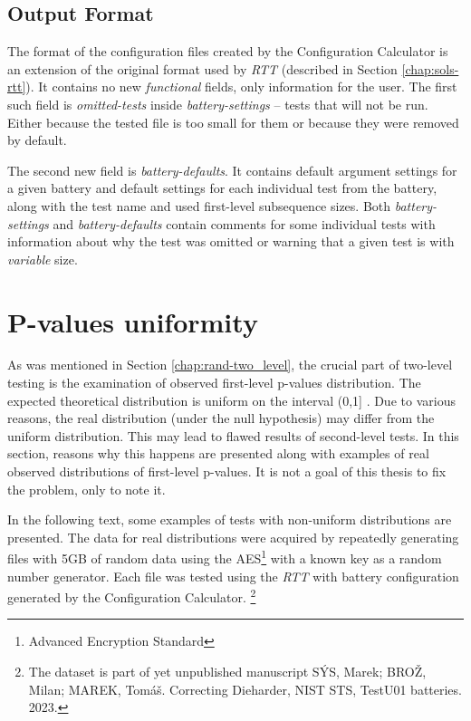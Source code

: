 \documentclass[
  digital,     %
  oneside,     %
  nosansbold,  %
  nocolorbold, %
  nolof,         %
  nolot,         %
]{fithesis4}
\begin{document}
\subsection{Output Format}
The format of the configuration files created by the Configuration Calculator is an extension of the original format used by \emph{RTT} (described in Section \ref{chap:sols-rtt}). It contains no new \emph{functional} fields, only information for the user. The first such field is \emph{omitted-tests} inside \emph{battery-settings} -- tests that will not be run. Either because the tested file is too small for them or because they were removed by default.

The second new field is \emph{battery-defaults}. It contains default argument settings for a given battery and default settings for each individual test from the battery, along with the test name and used first-level subsequence sizes. Both \emph{battery-settings} and \emph{battery-defaults} contain comments for some individual tests with information about why the test was omitted or warning that a given test is with \emph{variable} size.



\section{P-values uniformity} \label{chap:analysis-uniform}
As was mentioned in Section \ref{chap:rand-two_level}, the crucial part of two-level testing is the examination of observed first-level p-values distribution. The expected theoretical distribution is uniform on the interval (0,1] \cite[p.~14]{bad_day}. Due to various reasons, the real distribution (under the null hypothesis) may differ from the uniform distribution. This may lead to flawed results of second-level tests. In this section, reasons why this happens are presented along with examples of real observed distributions of first-level p-values. It is not a goal of this thesis to fix the problem, only to note it.

In the following text, some examples of tests with non-uniform distributions are presented. The data for real distributions were acquired by repeatedly generating files with 5GB of random data using the AES\footnote{Advanced Encryption Standard} with a known key as a random number generator. Each file was tested using the \emph{RTT} with battery configuration generated by the Configuration Calculator. \footnote{The dataset is part of yet unpublished manuscript SÝS, Marek; BROŽ, Milan; MAREK, Tomáš. Correcting Dieharder, NIST STS, TestU01 batteries. 2023.}
\end{document}
